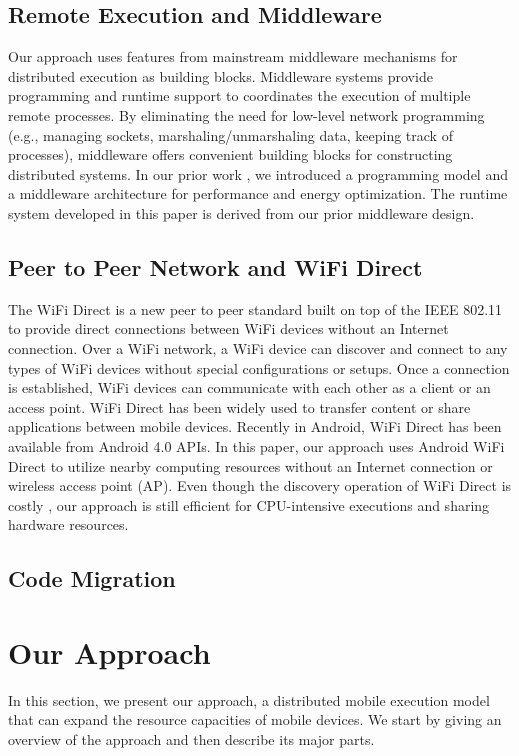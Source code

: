 \documentclass{sig-alternate}[10pt]
\begin{document}
\subsection{Remote Execution and Middleware}
Our approach uses features from mainstream middleware mechanisms for distributed execution as building blocks. Middleware systems provide programming and runtime support to coordinates the execution of multiple remote processes. By eliminating the need for low-level network programming (e.g., managing sockets, marshaling/unmarshaling data, keeping track of processes), middleware offers convenient building blocks for constructing distributed systems. In our prior work \cite{kwon+:mobilesoft2015}, we introduced a programming model and a middleware architecture for performance and energy optimization. The runtime system developed in this paper is derived from our prior middleware design.

\subsection{Peer to Peer Network and WiFi Direct}
The WiFi Direct \cite{alliance2010wi} is a new peer to peer standard built on top of the IEEE 802.11 to provide direct connections between WiFi devices without an Internet connection. Over a WiFi network, a WiFi device can discover and connect to any types of WiFi devices without special configurations or setups. Once a connection is established, WiFi devices can communicate with each other as a client or an access point. WiFi Direct has been widely used to transfer content or share applications between mobile devices. Recently in Android, WiFi Direct has been available from Android 4.0 APIs. In this paper, our approach uses Android WiFi Direct \cite{wifi:p2p} to utilize nearby computing resources without an Internet connection or wireless access point (AP). Even though the discovery operation of WiFi Direct is costly \cite{trifunovic2013slicing}, our approach is still efficient for CPU-intensive executions and sharing hardware resources. 

\subsection{Code Migration}


\section{Our Approach}
\label{sec:approach}
In this section, we present our approach, a distributed mobile execution model that can expand the resource capacities of mobile devices. We start by giving an overview of the approach and then describe its major parts.
\end{document}

